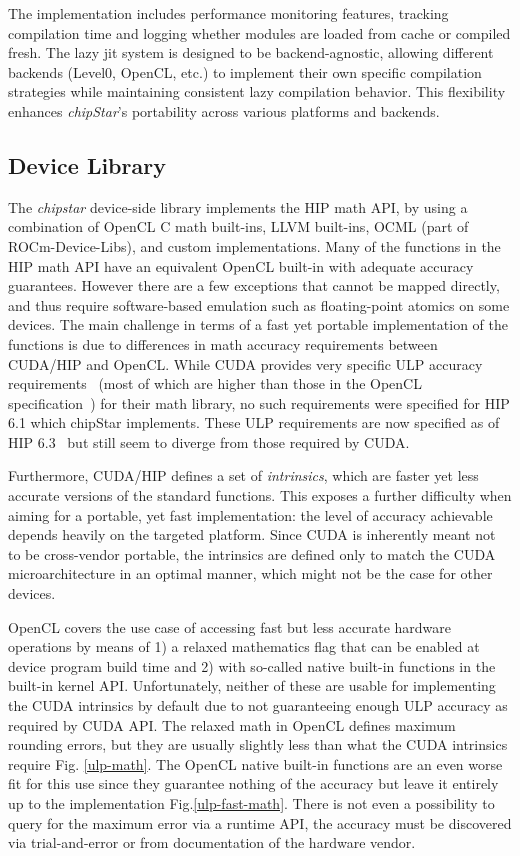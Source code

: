 \documentclass[Afour,sageh,times]{sagej}
\newcommand{\chipstar}{\textit{chipStar}\xspace}
\newcommand{\mycite}[1]{\citep{#1}}
\begin{document}
The implementation includes performance monitoring features, tracking compilation time and logging whether modules are loaded from cache or compiled fresh.
The lazy \gls{jit} system is designed to be backend-agnostic, allowing different backends (Level0, OpenCL, etc.) to implement their own specific compilation strategies while maintaining consistent lazy compilation behavior. This flexibility enhances \chipstar's portability across various platforms and backends.

\subsection{Device Library}
The \textit{chipstar} device-side library implements the HIP math API, by using a combination of OpenCL C math built-ins, LLVM built-ins, OCML (part of ROCm-Device-Libs), and custom implementations.
Many of the functions in the HIP math API have an equivalent OpenCL built-in with adequate accuracy guarantees. However there are a few exceptions that cannot be mapped directly, and thus require software-based emulation such as floating-point atomics on some devices. The main challenge in terms of a fast yet portable implementation of the functions is due to differences in math accuracy requirements between CUDA/HIP and OpenCL. While CUDA provides very specific ULP accuracy requirements~\mycite{cuda-ulp} (most of which are higher than those in the OpenCL specification~\mycite{opencl-ulp}) for their math library, no such requirements were specified for HIP 6.1 which chipStar implements. These ULP requirements are now specified as of HIP 6.3~\mycite{hip-ulp} but still seem to diverge from those required by CUDA.  

Furthermore, CUDA/HIP defines a set of \textit{intrinsics}, which are faster yet less accurate versions of the standard functions. 
This exposes a further difficulty when aiming for a portable, yet fast implementation: the level of accuracy achievable depends heavily on the targeted platform. Since CUDA is inherently meant not to be cross-vendor portable, the intrinsics are defined only to match the CUDA microarchitecture in an optimal manner, which might not be the case for other devices. 

OpenCL covers the use case of accessing fast but less accurate hardware operations by means of 1) a relaxed mathematics flag that can be enabled at device program build time and 2) with so-called native built-in functions in the built-in kernel API. Unfortunately, neither of these are usable for implementing the CUDA intrinsics by default due to not guaranteeing enough ULP accuracy as required by CUDA API. The relaxed math in OpenCL defines maximum rounding errors, but they are usually slightly less than what the CUDA intrinsics require Fig. \ref{ulp-math}. The OpenCL native built-in functions are an even worse fit for this use since they guarantee nothing of the accuracy but leave it entirely up to the implementation Fig.\ref{ulp-fast-math}. There is not even a possibility to query for the maximum error via a runtime API, the accuracy must be discovered via trial-and-error or from documentation of the hardware vendor. 
\end{document}
